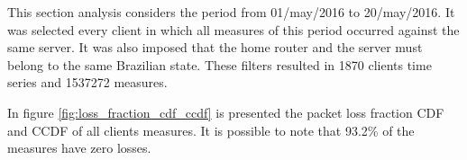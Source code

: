 This section analysis considers the period from 01/may/2016 to 20/may/2016. It was selected every client in which all measures of this period occurred against the same server. It was also imposed that the home router and the server must belong to the same Brazilian state. These filters resulted in 1870 clients time series and 1537272 measures.

In figure \ref{fig:loss_fraction_cdf_ccdf} is presented the packet loss fraction CDF and CCDF of all clients measures. It is possible to note that 93.2\% of the measures have zero losses.

\begin{figure}[H]
\end{figure}
